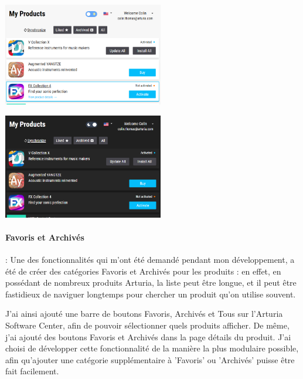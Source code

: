 \documentclass[francais]{rapportPFE}  %
\begin{document}
\begin{center}
    \centering
    \begin{minipage}{.5\textwidth}
    \centering
    \includegraphics[width=7cm]{graphics/daymode.png}
    \label{fig:test1}
    \end{minipage}%
    \begin{minipage}{.5\textwidth}
    \centering
    \includegraphics[width=7cm]{graphics/darkmode.png}
    \label{fig:test2}
    \end{minipage}
    \end{center}


\paragraph{Favoris et Archivés}: 
Une des fonctionnalités qui m'ont été demandé pendant mon développement, a été de créer des catégories Favoris et Archivés pour les produits : en effet, en possédant de nombreux produits Arturia, la liste peut être longue, et il peut être fastidieux de naviguer longtemps pour chercher un produit qu'on utilise souvent.

J'ai ainsi ajouté une barre de boutons Favoris, Archivés et Tous sur l'Arturia Software Center, afin de pouvoir sélectionner quels produits afficher.
De même, j'ai ajouté des boutons Favoris et Archivés dans la page détails du produit. 
J'ai choisi de développer cette fonctionnalité de la manière la plus modulaire possible, afin qu'ajouter une catégorie supplémentaire à 'Favoris' ou 'Archivés' puisse être fait facilement.
\end{document}
